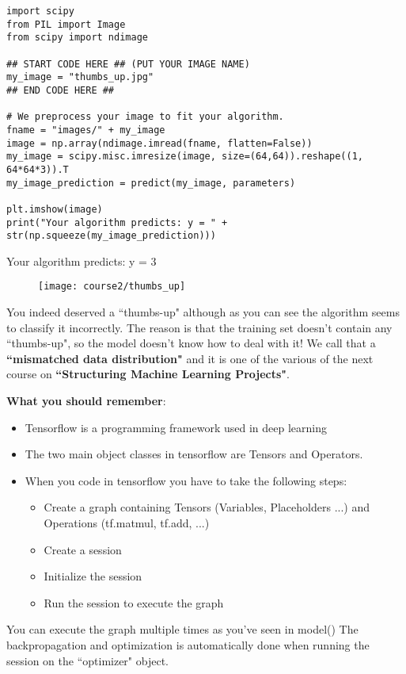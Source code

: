 \begin{verbatim}
import scipy
from PIL import Image
from scipy import ndimage

## START CODE HERE ## (PUT YOUR IMAGE NAME) 
my_image = "thumbs_up.jpg"
## END CODE HERE ##

# We preprocess your image to fit your algorithm.
fname = "images/" + my_image
image = np.array(ndimage.imread(fname, flatten=False))
my_image = scipy.misc.imresize(image, size=(64,64)).reshape((1, 64*64*3)).T
my_image_prediction = predict(my_image, parameters)

plt.imshow(image)
print("Your algorithm predicts: y = " + str(np.squeeze(my_image_prediction)))
\end{verbatim}
Your algorithm predicts: y = 3

\clearpage

\begin{figure}[h]
\begin{center}
\texttt{[image: course2/thumbs\_up]}
\end{center}
\end{figure}

You indeed deserved a ``thumbs-up" although as you can see the algorithm seems to classify it incorrectly. The reason is that the training set doesn't contain any ``thumbs-up", so the model doesn't know how to deal with it! We call that a {\color{red}\textbf {``mismatched data distribution"}} and it is one of the various of the next course on {\color{red}\textbf {``Structuring Machine Learning Projects"}}.



{\color{red}
{\textbf {What you should remember}}:
\begin{itemize}
\item Tensorflow is a programming framework used in deep learning
\item The two main object classes in tensorflow are Tensors and Operators.
\item When you code in tensorflow you have to take the following steps:
\begin{itemize}
\item Create a graph containing Tensors (Variables, Placeholders ...) and Operations (tf.matmul, tf.add, ...)
\item Create a session
\item Initialize the session
\item Run the session to execute the graph
\end{itemize}
\end{itemize}
}

You can execute the graph multiple times as you've seen in model()
The backpropagation and optimization is automatically done when running the session on the ``optimizer" object.


\clearpage